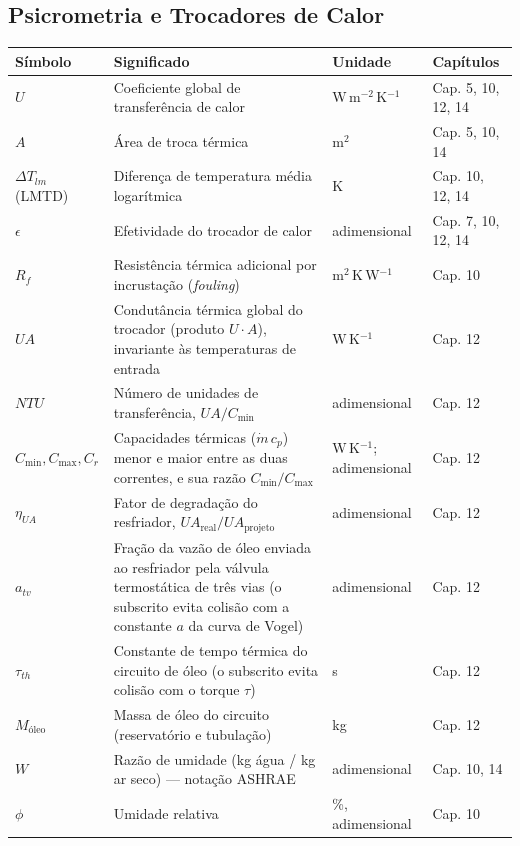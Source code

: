 \documentclass[12pt,a4paper]{article}
\numberwithin{equation}{section}
\numberwithin{table}{section}
\numberwithin{figure}{section}
\begin{document}
{{\subsection*{Psicrometria e Trocadores de Calor}
\begin{longtable}{>{\raggedright\arraybackslash}p{2.8cm} >{\raggedright\arraybackslash}p{5.3cm} >{\raggedright\arraybackslash}p{2.1cm} >{\raggedright\arraybackslash}p{4.2cm}}
	\toprule
	\textbf{Símbolo} & \textbf{Significado} & \textbf{Unidade} & \textbf{Capítulos} \\ \midrule
	\endhead
	$U$ & Coeficiente global de transferência de calor & W\,m$^{-2}$\,K$^{-1}$ & Cap. 5, 10, 12, 14 \\
	$A$ & Área de troca térmica & m$^2$ & Cap. 5, 10, 14 \\
	$\Delta T_{lm}$ (LMTD) & Diferença de temperatura média logarítmica & K & Cap. 10, 12, 14 \\
	$\epsilon$ & Efetividade do trocador de calor & adimensional & Cap. 7, 10, 12, 14 \\
	$R_f$ & Resistência térmica adicional por incrustação (\textit{fouling}) & m$^2$\,K\,W$^{-1}$ & Cap. 10 \\
	$UA$ & Condutância térmica global do trocador (produto $U \cdot A$), invariante às temperaturas de entrada & W\,K$^{-1}$ & Cap. 12 \\
	$NTU$ & Número de unidades de transferência, $UA/C_{\min}$ & adimensional & Cap. 12 \\
	$C_{\min}, C_{\max}, C_r$ & Capacidades térmicas ($\dot{m}\,c_p$) menor e maior entre as duas correntes, e sua razão $C_{\min}/C_{\max}$ & W\,K$^{-1}$; adimensional & Cap. 12 \\
	$\eta_{UA}$ & Fator de degradação do resfriador, $UA_{\text{real}}/UA_{\text{projeto}}$ & adimensional & Cap. 12 \\
	$a_{tv}$\dag & Fração da vazão de óleo enviada ao resfriador pela válvula termostática de três vias (o subscrito evita colisão com a constante $a$ da curva de Vogel) & adimensional & Cap. 12 \\
	$\tau_{th}$\dag & Constante de tempo térmica do circuito de óleo (o subscrito evita colisão com o torque $\tau$) & s & Cap. 12 \\
	$M_{\text{óleo}}$ & Massa de óleo do circuito (reservatório e tubulação) & kg & Cap. 12 \\
	$W$\dag & Razão de umidade (kg água / kg ar seco) — notação ASHRAE & adimensional & Cap. 10, 14 \\
	$\phi$ & Umidade relativa & \%, adimensional & Cap. 10 \\

\end{longtable}}}
\end{document}
